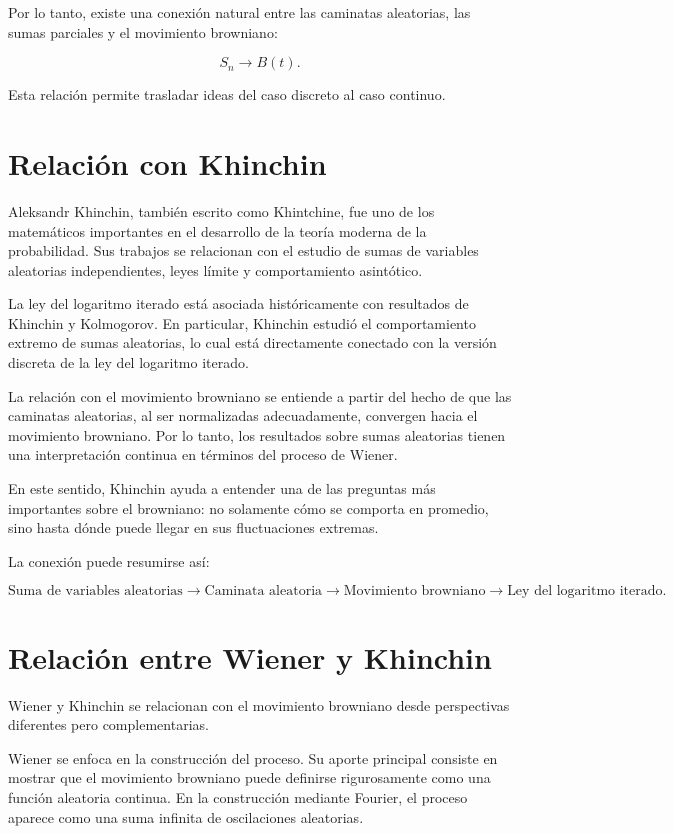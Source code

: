 \documentclass[12pt]{article}
\begin{document}
Por lo tanto, existe una conexión natural entre las caminatas aleatorias, las sumas parciales y el movimiento browniano:

\[
S_n
\longrightarrow
B(t).
\]

Esta relación permite trasladar ideas del caso discreto al caso continuo.

\section{Relación con Khinchin}

Aleksandr Khinchin, también escrito como Khintchine, fue uno de los matemáticos importantes en el desarrollo de la teoría moderna de la probabilidad. Sus trabajos se relacionan con el estudio de sumas de variables aleatorias independientes, leyes límite y comportamiento asintótico.

La ley del logaritmo iterado está asociada históricamente con resultados de Khinchin y Kolmogorov. En particular, Khinchin estudió el comportamiento extremo de sumas aleatorias, lo cual está directamente conectado con la versión discreta de la ley del logaritmo iterado.

La relación con el movimiento browniano se entiende a partir del hecho de que las caminatas aleatorias, al ser normalizadas adecuadamente, convergen hacia el movimiento browniano. Por lo tanto, los resultados sobre sumas aleatorias tienen una interpretación continua en términos del proceso de Wiener.

En este sentido, Khinchin ayuda a entender una de las preguntas más importantes sobre el browniano: no solamente cómo se comporta en promedio, sino hasta dónde puede llegar en sus fluctuaciones extremas.

La conexión puede resumirse así:

\[
\text{Suma de variables aleatorias}
\rightarrow
\text{Caminata aleatoria}
\rightarrow
\text{Movimiento browniano}
\rightarrow
\text{Ley del logaritmo iterado}.
\]

\section{Relación entre Wiener y Khinchin}

Wiener y Khinchin se relacionan con el movimiento browniano desde perspectivas diferentes pero complementarias.

Wiener se enfoca en la construcción del proceso. Su aporte principal consiste en mostrar que el movimiento browniano puede definirse rigurosamente como una función aleatoria continua. En la construcción mediante Fourier, el proceso aparece como una suma infinita de oscilaciones aleatorias.
\end{document}
